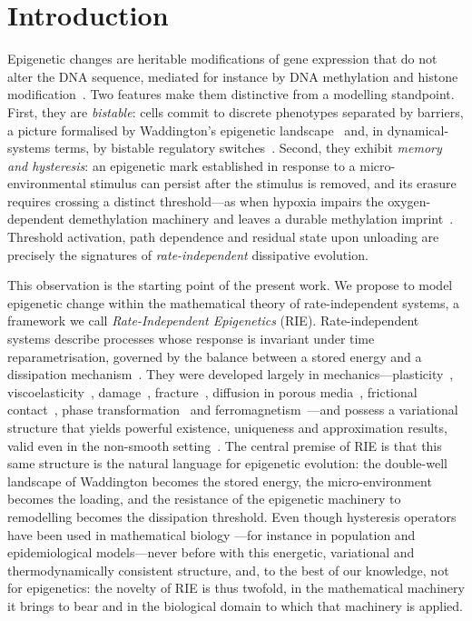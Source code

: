 \section{Introduction}\label{sec:intro}

Epigenetic changes are heritable modifications of gene expression that
do not alter the DNA sequence, mediated for instance by DNA
methylation and histone modification~\cite{Bird2002}. Two features make
them distinctive from a modelling standpoint. First, they are
\emph{bistable}: cells commit to discrete phenotypes separated by
barriers, a picture formalised by Waddington's epigenetic
landscape~\cite{Waddington1957} and, in dynamical-systems terms, by
bistable regulatory switches~\cite{Huang2007,Ferrell2012}. Second, they
exhibit \emph{memory and hysteresis}: an epigenetic mark established in
response to a micro-environmental stimulus can persist after the
stimulus is removed, and its erasure requires crossing a distinct
threshold---as when hypoxia impairs the oxygen-dependent demethylation
machinery and leaves a durable methylation
imprint~\cite{Thienpont2016}. Threshold activation, path dependence and
residual state upon unloading are precisely the signatures of
\emph{rate-independent} dissipative evolution.

This observation is the starting point of the present work. We propose
to model epigenetic change within the mathematical theory of
rate-independent systems, a framework we call \emph{Rate-Independent
Epigenetics} (RIE). Rate-independent systems describe processes whose
response is invariant under time reparametrisation, governed by the
balance between a stored energy and a dissipation
mechanism~\cite{MielkeTheil,Mielke2005,MielkeRoubicek}. They were
developed largely in mechanics---plasticity~\cite{lubliner2008plasticity,
hanreddy2013}, viscoelasticity~\cite{tschoegl1989},
damage~\cite{lemaitre2005uh}, fracture~\cite{francfort1998,dalmaso2006},
diffusion in porous media~\cite{bear1972}, frictional
contact~\cite{wriggers2006}, phase
transformation~\cite{balljames1987,mielke2002,carstensen2002uh} and
ferromagnetism~\cite{desimone2002,brokate1996}---and possess a
variational structure that yields powerful existence, uniqueness and
approximation results, valid even in the non-smooth
setting~\cite{MielkeRoubicek,visintin1994,Krasnoselskii}. The central
premise of RIE is that this same structure is the natural language for
epigenetic evolution: the double-well landscape of Waddington becomes
the stored energy, the micro-environment becomes the loading, and the
resistance of the epigenetic machinery to remodelling becomes the
dissipation threshold. Even though hysteresis operators have been used
in mathematical biology ---for instance in population and
epidemiological models---never before with this energetic, variational and
thermodynamically consistent structure, and, to the best of our
knowledge, not for epigenetics: the novelty of RIE is thus twofold, in
the mathematical machinery it brings to bear and in the biological
domain to which that machinery is applied.

